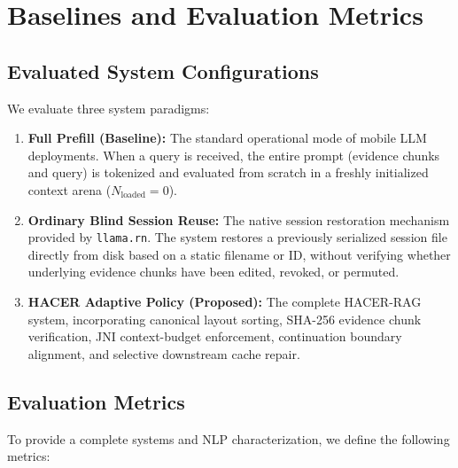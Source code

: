 \section{Baselines and Evaluation Metrics}
\label{sec:baselines_metrics}

\subsection{Evaluated System Configurations}
We evaluate three system paradigms:
\begin{enumerate}
    \item \textbf{Full Prefill (Baseline):} The standard operational mode of mobile LLM deployments. When a query is received, the entire prompt (evidence chunks and query) is tokenized and evaluated from scratch in a freshly initialized context arena ($N_{\text{loaded}} = 0$).
    \item \textbf{Ordinary Blind Session Reuse:} The native session restoration mechanism provided by \texttt{llama.rn}. The system restores a previously serialized session file directly from disk based on a static filename or ID, without verifying whether underlying evidence chunks have been edited, revoked, or permuted.
    \item \textbf{HACER Adaptive Policy (Proposed):} The complete HACER-RAG system, incorporating canonical layout sorting, SHA-256 evidence chunk verification, JNI context-budget enforcement, continuation boundary alignment, and selective downstream cache repair.
\end{enumerate}

\subsection{Evaluation Metrics}
To provide a complete systems and NLP characterization, we define the following metrics:

